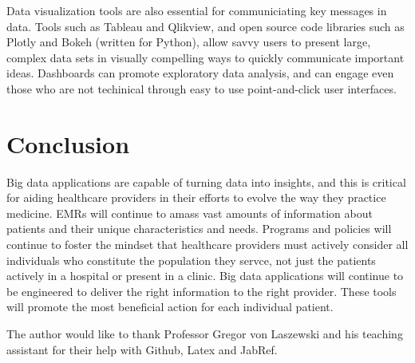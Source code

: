\documentclass[sigconf]{acmart}
\begin{document}
 Data visualization tools are also essential for communiciating key messages in data. Tools such as Tableau and Qlikview, and open source code libraries such as Plotly and Bokeh (written for Python), allow savvy users to present large, complex data sets in visually compelling ways to quickly communicate important ideas. Dashboards can promote exploratory data analysis, and can engage even those who are not techinical through easy to use point-and-click user interfaces.
 
\section{Conclusion}

 Big data applications are capable of turning data into insights, and this is critical for aiding healthcare providers in their efforts to evolve the way they practice medicine. EMRs will continue to amass vast amounts of information about patients and their unique characteristics and needs. Programs and policies will continue to foster the mindset that healthcare providers must actively consider all individuals who constitute the population they servce, not just the patients actively in a hospital or present in a clinic. Big data applications will continue to be engineered to deliver the right information to the right provider. These tools will promote the most beneficial action for each individual patient.   

\begin{acks}

  The author would like to thank Professor Gregor von Laszewski and his teaching assistant for their help with Github, Latex and JabRef. 

\end{acks}


 


\end{document}
